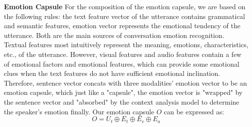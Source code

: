 \noindent\textbf{Emotion Capsule} For the composition of the emotion capsule, we are based on the following rules: the text feature vector of the utterance contains grammatical and semantic features, emotion vector represents the emotional tendency of the utterance. Both are the main sources of conversation emotion recognition. Textual features most intuitively represent the meaning, emotions, characteristics, etc., of the utterance. However, visual features and audio features contain a few of emotional factors and emotional features, which can provide some emotional clues when the text features do not have sufficient emotional inclination. Therefore, sentence vector concats with three modalities' emotion vector to be an emotion capsule, which just like a "capsule", the emotion vector is "wrapped" by the sentence vector and "absorbed" by the context analysis model to determine the speaker's emotion finally. Our emotion capsule $O$ can be expressed as:
\begin{equation}
	O=U_t \oplus E_t \oplus E_v \oplus E_a
\end{equation}	
